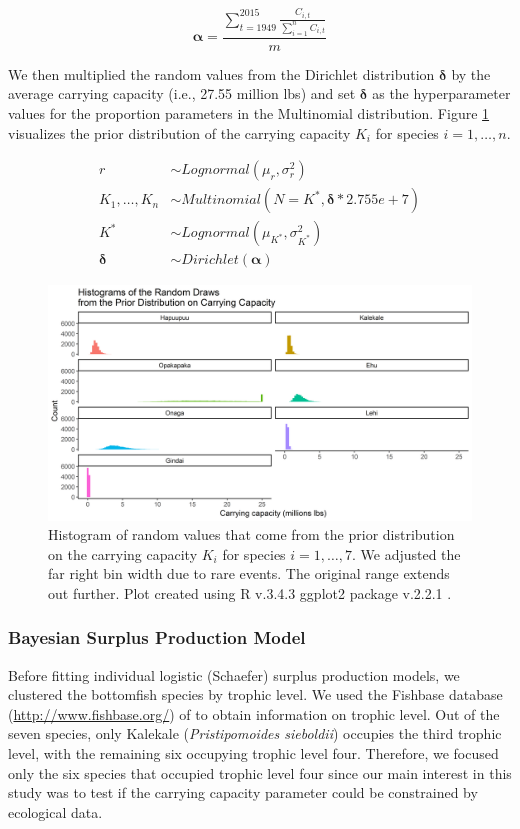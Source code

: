 \documentclass[oneside,12pt,final]{sty/ucthesis-CA2012}
\let\cite\citep                             %
\begin{document}
\begin{mainmatter}
\begin{equation*}
\boldsymbol{\alpha} = \frac{\sum_{t=1949}^{2015}\frac{C_{i,t}}{\sum_{i=1}^{n}C_{i,t}}}{m}
\end{equation*}

We then multiplied the random values from the Dirichlet distribution $\boldsymbol{\delta}$ by the average carrying capacity (i.e., 27.55 million lbs) and set $\boldsymbol{\delta}$ as the hyperparameter values for the proportion parameters in the Multinomial distribution. Figure \ref{priorK} visualizes the prior distribution of the carrying capacity $K_i$ for species $i=1,\dots,n$.

\begin{align*}
r & \sim Lognormal(\mu_r, \sigma_r^2) \\
K_1,\dots,K_n & \sim Multinomial(N=K^*, \boldsymbol{\delta}*2.755e+7) \\
K^* & \sim Lognormal(\mu_{K^*}, \sigma_{K^*}^2) \\
\boldsymbol{\delta} & \sim Dirichlet(\boldsymbol{\alpha})
\end{align*}

\begin{figure}[H]
     \centering
       \includegraphics[width=.9\textwidth]{fig/hist_prior_K}
    \caption{Histogram of random values that come from the prior distribution on the carrying capacity $K_i$ for species $i=1,\dots,7$. We adjusted the far right bin width due to rare events. The original range extends out further. Plot created using R v.3.4.3 \cite{Rcite} ggplot2 package v.2.2.1 \cite{ggplot}.}
    \label{priorK}
\end{figure}

\subsubsection*{Bayesian Surplus Production Model}
Before fitting individual logistic (Schaefer) surplus production models, we clustered the bottomfish species by trophic level. We used the Fishbase database (\url{http://www.fishbase.org/}) of \citet{fishbase} to obtain information on trophic level. Out of the seven species, only Kalekale (\textit{Pristipomoides sieboldii}) occupies the third trophic level, with the remaining six occupying trophic level four. Therefore, we focused only the six species that occupied trophic level four since our main interest in this study was to test if the carrying capacity parameter could be constrained by ecological data. 


\end{mainmatter}
\end{document}
